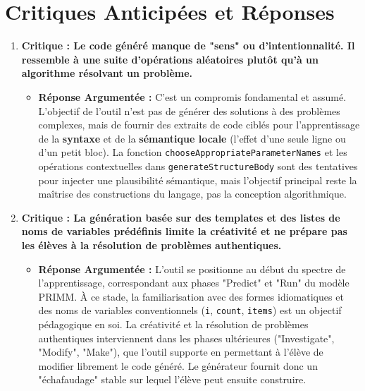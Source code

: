 \documentclass[a4paper, 11pt]{article}
\begin{document}
\section{Critiques Anticipées et Réponses}

\begin{tcolorbox}[colback=red!5!white,colframe=red!75!black,title=Critiques Académiques Potentielles]
    \begin{enumerate}
        \item \textbf{Critique : Le code généré manque de "sens" ou d'intentionnalité. Il ressemble à une suite d'opérations aléatoires plutôt qu'à un algorithme résolvant un problème.}
        \begin{itemize}
            \item \textbf{Réponse Argumentée :} C'est un compromis fondamental et assumé. L'objectif de l'outil n'est pas de générer des solutions à des problèmes complexes, mais de fournir des extraits de code ciblés pour l'apprentissage de la \textbf{syntaxe} et de la \textbf{sémantique locale} (l'effet d'une seule ligne ou d'un petit bloc). La fonction \texttt{chooseAppropriateParameterNames} et les opérations contextuelles dans \texttt{generateStructureBody} sont des tentatives pour injecter une plausibilité sémantique, mais l'objectif principal reste la maîtrise des constructions du langage, pas la conception algorithmique.
        \end{itemize}
        \vspace{1em}

        \item \textbf{Critique : La génération basée sur des templates et des listes de noms de variables prédéfinis limite la créativité et ne prépare pas les élèves à la résolution de problèmes authentiques.}
        \begin{itemize}
            \item \textbf{Réponse Argumentée :} L'outil se positionne au début du spectre de l'apprentissage, correspondant aux phases "Predict" et "Run" du modèle PRIMM. À ce stade, la familiarisation avec des formes idiomatiques et des noms de variables conventionnels (\texttt{i}, \texttt{count}, \texttt{items}) est un objectif pédagogique en soi. La créativité et la résolution de problèmes authentiques interviennent dans les phases ultérieures ("Investigate", "Modify", "Make"), que l'outil supporte en permettant à l'élève de modifier librement le code généré. Le générateur fournit donc un "échafaudage" stable sur lequel l'élève peut ensuite construire.
        \end{itemize}
        \vspace{1em}


\end{enumerate}
\end{tcolorbox}
\end{document}
